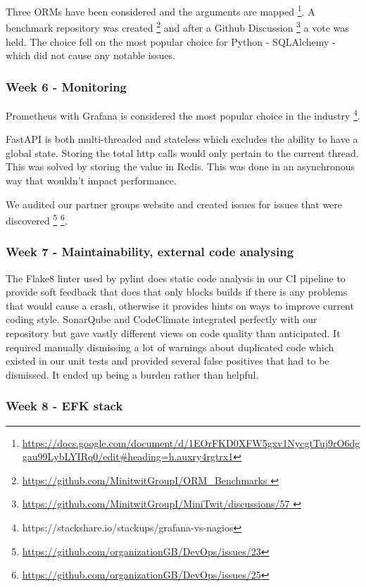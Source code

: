 \documentclass{article}
\begin{document}
Three ORMs have been considered and the arguments are mapped \footnote{\url{https://docs.google.com/document/d/1EOrFKD0XFW5gxv1NycgtTuj9rO6dggau99LybLYIRq0/edit\#heading=h.auxry4rgtrx1}}. A benchmark repository was created \footnote{\url{https://github.com/MinitwitGroupI/ORM_Benchmarks }} and after a Github Discussion \footnote{\url{https://github.com/MinitwitGroupI/MiniTwit/discussions/57 }} a vote was held. The choice fell on the most popular choice for Python - SQLAlchemy - which did not cause any notable issues. 

\subsubsection{Week 6 - Monitoring }

Prometheus with Grafana is considered the most popular choice in the industry \footnote{https://stackshare.io/stackups/grafana-vs-nagios}. 


FastAPI is both multi-threaded and stateless which excludes the ability to have a global state. Storing the total http calls would only pertain to the current thread. This was solved by storing the value in Redis. This was done in an asynchronous way that wouldn't impact performance. 

We audited our partner groups website and created issues for issues that were discovered \footnote{\url{https://github.com/organizationGB/DevOps/issues/23}} \footnote{\url{https://github.com/organizationGB/DevOps/issues/25}}. 

\subsubsection{Week 7 - Maintainability, external code analysing }

The Flake8 linter used by pylint does static code analysis in our CI pipeline to provide soft feedback that does that only blocks builds if there is any problems that would cause a crash, otherwise it provides hints on ways to improve current coding style. SonarQube and CodeClimate integrated perfectly with our repository but gave vastly different views on code quality than anticipated. It required manually dismissing a lot of warnings about duplicated code which existed in our unit tests and provided several false positives that had to be dismissed. It ended up being a burden rather than helpful.

\subsubsection{Week 8 - EFK stack}
\end{document}
